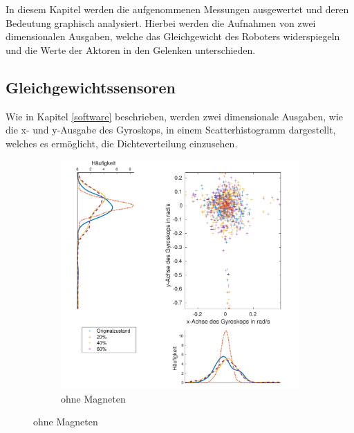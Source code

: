 In diesem Kapitel werden die aufgenommenen Messungen ausgewertet und deren Bedeutung graphisch analysiert. Hierbei werden die Aufnahmen von zwei dimensionalen Ausgaben, welche das Gleichgewicht des Roboters widerspiegeln und die Werte der Aktoren in den Gelenken unterschieden.

\subsection{Gleichgewichtssensoren} \label{gleichgewicht}

Wie in Kapitel \ref{software} beschrieben, werden zwei dimensionale Ausgaben, wie die x- und y-Ausgabe des Gyroskops, in einem Scatterhistogramm dargestellt, welches es ermöglicht, die Dichteverteilung einzusehen. 

\begin{figure}[b!]
	\centering
	\begin{adjustwidth}{-0.2\linewidth}{-0.2\linewidth}
		\hspace{+20pt}
		\begin{subfigure}[c]{.5\linewidth}
			\centering
			\includegraphics[width=\linewidth]{Bilder/Gyr_Grund_20_40_60_ohneM.pdf}
			\caption{ohne Magneten} \label{Gyr_ohne}
			\vspace{5pt}
		\end{subfigure}
		\hspace{-35pt}

\end{adjustwidth}
\end{figure}
